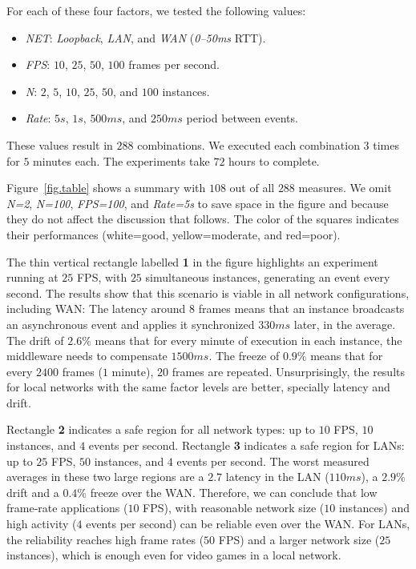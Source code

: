 \documentclass[sigplan,screen]{acmart}
\begin{document}
For each of these four factors, we tested the following values:
%
\begin{itemize}
\item \emph{NET}: \emph{Loopback}, \emph{LAN}, and \emph{WAN} (\emph{0--50ms} RTT).
\item \emph{FPS}: $10$, $25$, $50$, $100$ frames per second.     %
\item \emph{N}: $2$, $5$, $10$, $25$, $50$, and $100$ instances. %
\item \emph{Rate}: $5s$, $1s$, $500ms$, and $250ms$ period between events.
\end{itemize}                                                    %
%
These values result in $288$ combinations.
We executed each combination $3$ times for $5$ minutes each.
The experiments take $72$ hours to complete.

Figure~\ref{fig.table} shows a summary with $108$ out of all $288$ measures.
We omit \emph{N=2}, \emph{N=100}, \emph{FPS=100}, and \emph{Rate=5s} to save
space in the figure and because they do not affect the discussion that follows.
The color of the squares indicates their performances
    (white=good, yellow=moderate, and red=poor).

The thin vertical rectangle labelled \textbf{1} in the figure highlights an
experiment running at $25$ FPS, with $25$ simultaneous instances, generating an
event every second.
%
The results show that this scenario is viable in all network configurations,
including WAN:
%
The latency around $8$ frames means that an instance broadcasts an asynchronous
event and applies it synchronized $330ms$ later, in the average.
The drift of $2.6\%$ means that for every minute of execution in each instance,
the middleware needs to compensate $1500ms$.
The freeze of $0.9\%$ means that for every $2400$ frames ($1$ minute), $20$
frames are repeated.
%
Unsurprisingly, the results for local networks with the same factor levels are
better, specially latency and drift.

Rectangle \textbf{2} indicates a safe region for all network types: up to $10$
FPS, $10$ instances, and $4$ events per second.
%
Rectangle \textbf{3} indicates a safe region for LANs: up to $25$ FPS, $50$
instances, and $4$ events per second.
%
The worst measured averages in these two large regions are
    a $2.7$ latency in the LAN ($110ms$),
    a $2.9\%$ drift and
    a $0.4\%$ freeze over the WAN.
%
Therefore, we can conclude that low frame-rate applications ($10$ FPS), with
reasonable network size ($10$ instances) and high activity ($4$ events per
second) can be reliable even over the WAN.
For LANs, the reliability reaches high frame rates ($50$ FPS) and a larger
network size ($25$ instances), which is enough even for video games in a local
network.
\end{document}
